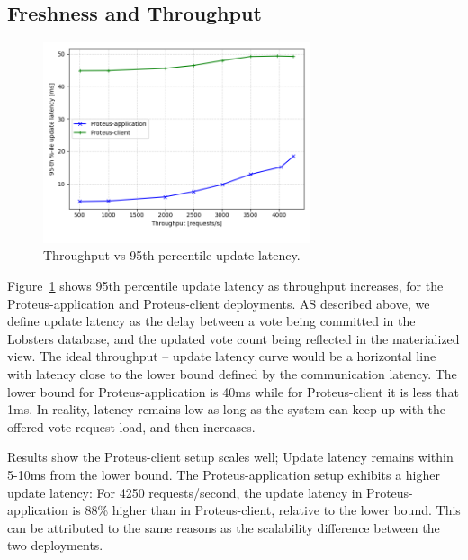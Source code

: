 \subsection{Freshness and Throughput}
\label{sec:eval_freshness_throughput}

\begin{figure}[H]
\centering
  \includegraphics[width=0.7\textwidth]{./figures/evaluation/fr_latency_throughput.png}
  \caption{Throughput vs 95th percentile update latency.}
  \label{fig:fr_latency_throughput}
\end{figure}

Figure~\ref{fig:fr_latency_throughput} shows 95th percentile update latency as throughput increases,
for the Proteus-application and Proteus-client deployments.
AS described above, we define update latency as the delay between a vote being committed in the
Lobsters database, and the updated vote count being reflected in the materialized view.
The ideal throughput -- update latency curve would be a horizontal line with latency close to the lower bound defined by
the communication latency.
The lower bound for Proteus-application is 40ms while for Proteus-client it is less that 1ms.
In reality, latency remains low as long as the system can keep up with the offered vote request load,
and then increases.

Results show the Proteus-client setup scales well; Update latency remains within 5-10ms from the lower bound.
The Proteus-application setup exhibits a higher update latency:
For 4250 requests/second, the update latency in Proteus-application is 88\% higher than in Proteus-client,
relative to the lower bound.
This can be attributed to the same reasons as the scalability difference between the two deployments.

